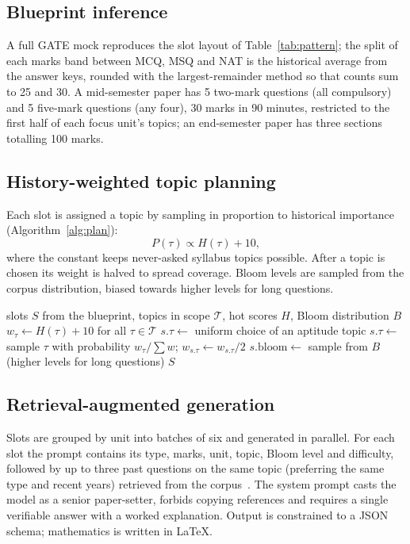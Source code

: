 \subsection{Blueprint inference}
A full GATE mock reproduces the slot layout of Table~\ref{tab:pattern}; the split of each marks band between MCQ, MSQ and
NAT is the historical average from the answer keys, rounded with the largest-remainder method so that counts sum to 25
and 30. A mid-semester paper has 5 two-mark questions (all compulsory) and 5 five-mark questions (any four), 30 marks
in 90 minutes, restricted to the first half of each focus unit's topics; an end-semester paper has three sections
totalling 100 marks.

\subsection{History-weighted topic planning}
Each slot is assigned a topic by sampling in proportion to historical importance (Algorithm~\ref{alg:plan}):
\begin{equation}
  P(\tau)\propto H(\tau)+10 ,
  \label{eq:sample}
\end{equation}
where the constant keeps never-asked syllabus topics possible. After a topic is chosen its weight is halved to spread
coverage. Bloom levels are sampled from the corpus distribution, biased towards higher levels for long questions.

\begin{algorithm}[t]
\caption{History-weighted planning of a paper}
\label{alg:plan}
\begin{algorithmic}[1]
\Require slots $S$ from the blueprint, topics in scope $\mathcal{T}$, hot scores $H$, Bloom distribution $B$
\State $w_\tau \gets H(\tau)+10$ for all $\tau\in\mathcal{T}$
   \State $s.\tau \gets$ uniform choice of an aptitude topic
  \Else
    \State $s.\tau \gets$ sample $\tau$ with probability $w_\tau/\sum w$; \quad $w_{s.\tau}\gets w_{s.\tau}/2$
  \EndIf
  \State $s.\text{bloom} \gets$ sample from $B$ (higher levels for long questions)
\EndFor
\State \Return $S$
\end{algorithmic}
\end{algorithm}

\subsection{Retrieval-augmented generation}
Slots are grouped by unit into batches of six and generated in parallel. For each slot the prompt contains its type,
marks, unit, topic, Bloom level and difficulty, followed by up to three past questions on the same topic (preferring the
same type and recent years) retrieved from the corpus~\cite{lewis2020}. The system prompt casts the model as a senior
paper-setter, forbids copying references and requires a single verifiable answer with a worked explanation. Output is
constrained to a JSON schema; mathematics is written in LaTeX.

